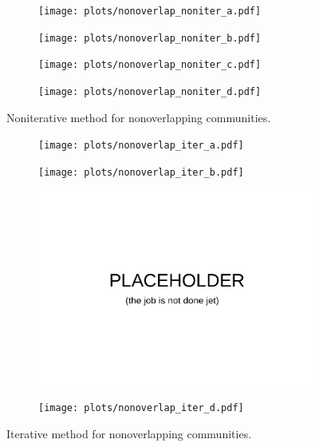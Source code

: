 \newpage

\begin{figure}
    \centering
    \begin{subfigure}{0.5\textwidth}
    \texttt{[image: plots/nonoverlap\_noniter\_a.pdf]}
    \end{subfigure}%
    \begin{subfigure}{0.5\textwidth}
    \texttt{[image: plots/nonoverlap\_noniter\_b.pdf]}
    \end{subfigure}
    \begin{subfigure}{0.5\textwidth}
    \texttt{[image: plots/nonoverlap\_noniter\_c.pdf]}
    \end{subfigure}%
    \begin{subfigure}{0.5\textwidth}
    \texttt{[image: plots/nonoverlap\_noniter\_d.pdf]}
    \end{subfigure}
    \caption{Noniterative method for nonoverlapping communities.}
\end{figure}

\begin{figure}
    \centering
    \begin{subfigure}{0.5\textwidth}
    \texttt{[image: plots/nonoverlap\_iter\_a.pdf]}
    \end{subfigure}%
    \begin{subfigure}{0.5\textwidth}
    \texttt{[image: plots/nonoverlap\_iter\_b.pdf]}
    \end{subfigure}
    \begin{subfigure}{0.5\textwidth}
    \includegraphics[width=\linewidth]{plots/placeholder.pdf}
    \end{subfigure}%
    \begin{subfigure}{0.5\textwidth}
    \texttt{[image: plots/nonoverlap\_iter\_d.pdf]}
    \end{subfigure}
    \caption{Iterative method for nonoverlapping communities.}
\end{figure}

